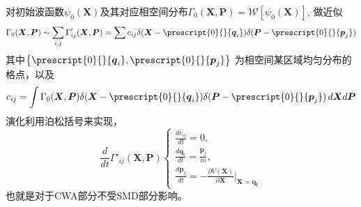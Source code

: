 对初始波函数$\psi_0(\boldsymbol{X})$及其对应相空间分布$ \Gamma_0(\boldsymbol{X}, \boldsymbol{P}) = \mathcal{W}\left[ \psi_0(\boldsymbol{X}) \right] $, 做近似
\begin{equation}
	\Gamma_0 (\boldsymbol{X}, \boldsymbol{P}) \sim \sum_{i,j} \Gamma_{ij}'(\boldsymbol{X}, \boldsymbol{P}) = \sum c_{ij} \delta(\boldsymbol{X} - \prescript{0}{}{\boldsymbol{q}_i}) \delta(\boldsymbol{P} - \prescript{0}{}{\boldsymbol{p}_j})
\end{equation} 
其中$\left\{ \prescript{0}{}{\boldsymbol{q}_i}, \prescript{0}{}{\boldsymbol{p}_j} \right\} $ 为相空间某区域均匀分布的格点，以及
\begin{equation}
	c_{ij} = \int \Gamma_0(\boldsymbol{X}, \boldsymbol{P}) \delta(\boldsymbol{X} - \prescript{0}{}{\boldsymbol{q}_i}) \delta(\boldsymbol{P} - \prescript{0}{}{\boldsymbol{p}_j}) \, d\boldsymbol{X}d\boldsymbol{P} 
\end{equation} 
演化利用泊松括号来实现，
\begin{equation}
\frac{d}{dt} \Gamma'_{ij}(\boldsymbol{X}, \boldsymbol{P})
\begin{cases}
	\frac{d c_{ij}}{d t} = 0 , \\
	\frac{d \boldsymbol{q}_i}{d t} = \frac{\boldsymbol{p}_j}{m} , \\
	\frac{d \boldsymbol{p}_j}{d t} = - \frac{\partial V(\boldsymbol{X})}{\partial \boldsymbol{X}}\bigg|_{\boldsymbol{X} = \boldsymbol{q_i}}
\end{cases}
\end{equation}
也就是对于CWA部分不受SMD部分影响。

